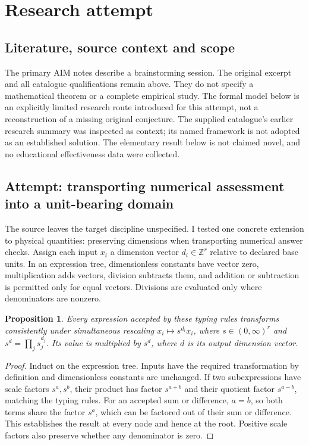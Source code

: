 \documentclass[11pt]{article}
\newtheorem{proposition}{Proposition}
\begin{document}
\section{Research attempt}
\subsection{Literature, source context and scope}
The primary AIM notes describe a brainstorming session. The original excerpt and all catalogue qualifications remain above. They do not specify a mathematical theorem or a complete empirical study. The formal model below is an explicitly limited research route introduced for this attempt, not a reconstruction of a missing original conjecture. The supplied catalogue's earlier research summary was inspected as context; its named framework is not adopted as an established solution. The elementary result below is not claimed novel, and no educational effectiveness data were collected.

\subsection{Attempt: transporting numerical assessment into a unit-bearing domain}
The source leaves the target discipline unspecified. I tested one concrete extension to physical quantities: preserving dimensions when transporting numerical answer checks. Assign each input $x_i$ a dimension vector $d_i\in\mathbb Z^r$ relative to declared base units. In an expression tree, dimensionless constants have vector zero, multiplication adds vectors, division subtracts them, and addition or subtraction is permitted only for equal vectors. Divisions are evaluated only where denominators are nonzero.
\begin{proposition}
Every expression accepted by these typing rules transforms consistently under simultaneous rescaling $x_i\mapsto s^{d_i}x_i$, where $s\in(0,\infty)^r$ and $s^d=\prod_j s_j^{d_j}$. Its value is multiplied by $s^d$, where $d$ is its output dimension vector.
\end{proposition}
\begin{proof}
Induct on the expression tree. Inputs have the required transformation by definition and dimensionless constants are unchanged. If two subexpressions have scale factors $s^a,s^b$, their product has factor $s^{a+b}$ and their quotient factor $s^{a-b}$, matching the typing rules. For an accepted sum or difference, $a=b$, so both terms share the factor $s^a$, which can be factored out of their sum or difference. This establishes the result at every node and hence at the root. Positive scale factors also preserve whether any denominator is zero.
\end{proof}
\end{document}
